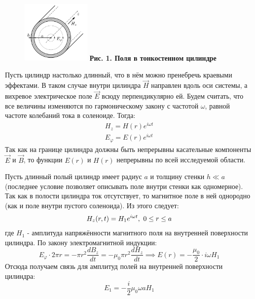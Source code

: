 \documentclass[15pt,a5paper,reqno]{article}
\begin{document}
    \begin{figure}
        \includegraphics[width=0.3\textwidth]{images/picture_1.png}
        \textbf{Рис. 1. Поля в тонкостенном цилиндре}
    \end{figure}
    Пусть цилиндр настолько длинный, что в нём можно пренебречь краевыми эффектами. В таком случае внутри цилиндра $\vec H$ направлен вдоль оси системы, а вихревое электрическое поле $\vec E$ всюду перпендикулярно ей. Будем считать, что все величины изменяются по гармоническому закону с частотой $\omega$, равной частоте колебаний тока в соленоиде. Тогда:
    \begin{equation}\label{fields}
    \begin{split}
        H_z = H(r)e^{i\omega t}\\
        E_{\varphi} = E(r)e^{i\omega t}
    \end{split}
    \end{equation}
    Так как на границе цилиндра должны быть непрерывны касательные компоненты $\vec E$ и $\vec B$, то функции $E(r)$ и $H(r)$ непрерывны по всей исследуемой области.

    Пусть длинный полый цилиндр имеет радиус $a$ и толщину стенки $h \ll a$ (последнее условие позволяет описывать поле внутри стенки как одномерное). Так как в полости цилиндра ток отсутствует, то магнитное поле в ней однородно (как и поле внутри пустого соленоида). Из этого следует:
    \begin{equation*}
        H_z(r, t) = H_1e^{i\omega t},\\\ 0 \leq r \leq a
    \end{equation*}
    где $H_1$ - амплитуда напряжённости магнитного поля на внутренней поверхности цилиндра. По закону электромагнитной индукции:
    \begin{equation*}
        E_{\varphi}\cdot 2\pi r = -\pi r^2 \frac{dB_z}{dt} = -\mu_0 \pi r^2 \frac{dH_z}{dt} \implies E(r) = -\frac{\mu_0}{2}\cdot i\omega H_1
    \end{equation*}
    Отсюда получаем связь для амплитуд полей на внутренней поверхности цилиндра:
    \begin{equation*}
        E_1 = -\frac{i}{2}\mu_0\omega aH_1
    \end{equation*}
\end{document}
